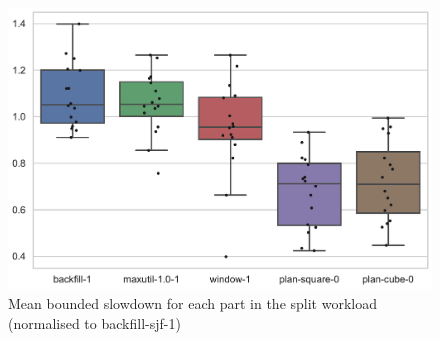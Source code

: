 \documentclass[thesis-en.tex]{subfiles}
\begin{document}
\begin{figure}[p]
    \centering
    \includegraphics[width=\textwidth]{best_io-aware_parts_bounded-slowdown_box.pdf}
    \caption{Mean bounded slowdown for each part in the split workload (normalised to backfill-sjf-1)}
    \label{fig:best_io-aware_parts_bounded-slowdown_box}
\end{figure}

\FloatBarrier
\end{document}
